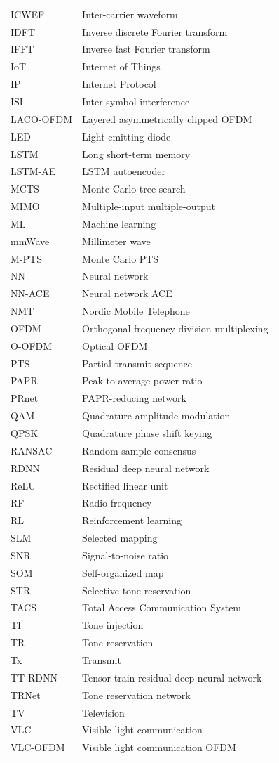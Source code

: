 \documentclass[conference]{IEEEtran}
\begin{document}
\begin{tabular}{ll}
ICWEF & Inter-carrier waveform \\
IDFT & Inverse discrete Fourier transform \\
IFFT & Inverse fast Fourier transform \\
IoT & Internet of Things \\
IP & Internet Protocol \\
ISI & Inter-symbol interference \\
LACO-OFDM & Layered asymmetrically clipped OFDM \\
LED & Light-emitting diode \\
LSTM & Long short-term memory \\
LSTM-AE & LSTM autoencoder \\
MCTS & Monte Carlo tree search \\
MIMO & Multiple-input multiple-output \\
ML & Machine learning \\
mmWave & Millimeter wave \\
M-PTS & Monte Carlo PTS \\
NN & Neural network \\
NN-ACE & Neural network ACE \\
NMT & Nordic Mobile Telephone \\
OFDM & Orthogonal frequency division multiplexing \\
O-OFDM & Optical OFDM \\
PTS & Partial transmit sequence \\
PAPR & Peak-to-average-power ratio \\
PRnet & PAPR-reducing network \\
QAM & Quadrature amplitude modulation \\
QPSK & Quadrature phase shift keying \\
RANSAC & Random sample consensus \\
RDNN & Residual deep neural network \\
ReLU & Rectified linear unit \\
RF & Radio frequency \\
RL & Reinforcement learning \\
SLM & Selected mapping \\
SNR & Signal-to-noise ratio \\
SOM & Self-organized map \\
STR & Selective tone reservation \\
TACS & Total Access Communication System \\
TI & Tone injection \\
TR & Tone reservation \\
Tx & Transmit \\
TT-RDNN & Tensor-train residual deep neural network \\
TRNet & Tone reservation network \\
TV & Television \\
VLC & Visible light communication \\
VLC-OFDM & Visible light communication OFDM \\
\end{tabular}
\end{document}
